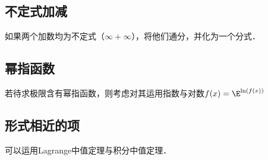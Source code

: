 \subsection{不定式加减}
如果两个加数均为不定式（$\infty+\infty$），将他们通分，并化为一个分式．

\subsection{幂指函数}
若待求极限含有幂指函数，则考虑对其运用指数与对数$f(x)=\E^{\ln(f(x))}$

\subsection{形式相近的项}
可以运用Lagrange中值定理与积分中值定理．